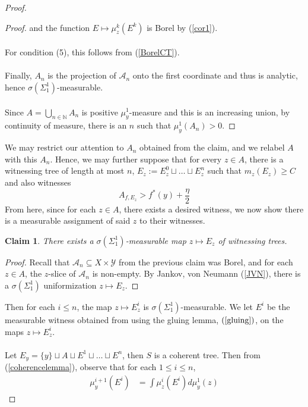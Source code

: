 \documentclass{article}
\let\oldref\ref
\renewcommand{\ref}[1]{(\oldref{#1})}
\newtheorem{claim}[theorem]{Claim}
\theoremstyle{definition}
\begin{document}
\begin{proof}
\begin{proof}
        and the function $ E\mapsto \mu^k_z(E^k) $ is Borel by \ref{cor1}.\\\\
        For condition (5), this follows from \ref{BorelCT}.\\\\
        Finally, $ A_n $ is the projection of $ \mathcal{A}_n $ onto the first coordinate and thus is analytic, hence $ \sigma(\Sigma^1_1) $-measurable.\\\\
        Since $ A = \bigcup_{n\in \mathbb{N}} A_n $ is positive $ \mu^1_y $-measure and this is an increasing union, by continuity of measure, there is an $ n $ such that $ \mu^1_y(A_n) > 0 $.
    \end{proof}
    \noindent We may restrict our attention to $ A_n $ obtained from the claim, and we relabel $ A $ with this $ A_n $. Hence, we may further suppose that for every $ z\in A $, there is a witnessing tree of length at most $ n $, $ E_z:=E^0_z \sqcup \ldots \sqcup E^n_z $ such that $ m_z(E_z) \geq C $ and also witnesses
    \[
    A_{f,E_z} > f^*(y)+\frac{\eta}{2}
    \]
    From here, since for each $ z\in A $, there exists a desired witness, we now show there is a measurable assignment of said $ z $ to their witnesses.
    \begin{claim}\label{invariance_claim}
        There exists a $ \sigma(\Sigma^1_1) $-measurable map $ z\mapsto E_z $ of witnessing trees.
    \end{claim}
    \begin{proof}
        Recall that $ \mathcal{A}_n\subseteq X\times \mathcal{Y} $ from the previous claim was Borel, and for each $ z\in A $, the $ z $-slice of $ \mathcal{A}_n $ is non-empty. By Jankov, von Neumann \ref{JVN}, there is a $ \sigma(\Sigma^1_1) $ uniformization $ z\mapsto E_z $.
    \end{proof}
    \noindent Then for each $ i\leq n $, the map $ z\mapsto E_z^i $ is $ \sigma(\Sigma^1_1) $-measurable. We let $ E^i $ be the measurable witness obtained from using the gluing lemma, $ \ref{gluing}  $, on the maps $ z\mapsto E_z^i $.\\\\ 
    Let $ E_y = \{y\}\sqcup A \sqcup E^1\sqcup\ldots \sqcup E^n $, then $ S $ is a coherent tree. Then from \ref{coherencelemma}, observe that for each $ 1\leq i \leq n $,
    \begin{align*}
        \mu^{i+1}_y(E^i) &= \int \mu^{i}_z(E^i)d\mu^1_y(z)
    \end{align*}

\end{proof}
\end{document}
